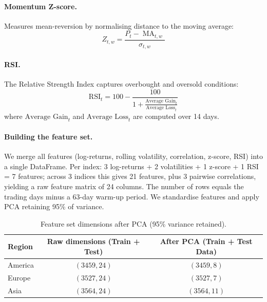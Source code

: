 \documentclass[11pt, a4paper]{article}
\begin{document}
\paragraph{Momentum Z-score.}
Measures mean-reversion by normalising distance to the moving average:
\begin{equation}
\label{eq:zscore}
    Z_{t,w} = \frac{P_t - \operatorname{MA}_{t,w}}{\sigma_{t,w}}
\end{equation}

\paragraph{RSI.}
The Relative Strength Index captures overbought and oversold conditions:
\begin{equation}
\label{eq:rsi}
    \text{RSI}_{t} = 100 - \frac{100}{1 + \frac{\text{Average Gain}_{t}}{\text{Average Loss}_{t}}}  
\end{equation}
where $\text{Average Gain}_{t}$ and $\text{Average Loss}_{t}$ are computed over 14 days.

\paragraph{Building the feature set.}
We merge all features (log-returns, rolling volatility, correlation, z-score, RSI) into a single DataFrame. Per index: 3 log-returns + 2 volatilities + 1 z-score + 1 RSI = 7 features; across 3 indices this gives 21 features, plus 3 pairwise correlations, yielding a raw feature matrix of 24 columns. The number of rows equals the trading days minus a 63-day warm-up period. We standardise features and apply PCA retaining 95\% of variance.

\begin{table}[H]
\centering
\caption{Feature set dimensions after PCA (95\% variance retained).}
\label{tab:feature_engineering}
\small
\renewcommand{\arraystretch}{1.1}
\begin{tabular}{l c c}
\toprule
\textbf{Region} & \textbf{Raw dimensions (Train + Test)} & \textbf{After PCA (Train + Test Data)} \\
\midrule
America & $(3459, 24)$ & $(3459, 8)$ \\
Europe  & $(3527, 24)$ & $(3527, 7)$ \\
Asia    & $(3564, 24)$ & $(3564, 11)$ \\
\bottomrule
\end{tabular}
\end{table}
\end{document}
